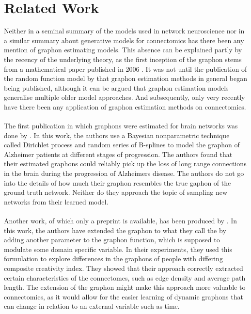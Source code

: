 \documentclass[11pt]{report} %
\begin{document}
\section{Related Work} 
Neither in a seminal summary of the models used in network neuroscience \cite{Bassett2018} nor in a similar summary about generative models for connectomics \cite{Betzel2016} has there been any mention of graphon estimating models. 
This absence can be explained partly by the recency of the underlying theory, as the first inception of the graphon stems from a mathematical paper published in 2006 \cite{lovasz2006}. 
It was not until the publication of the random function model by  that graphon estimation methods in general began being published, although it can be argued that graphon estimation models generalise multiple older model approaches.
And subsequently, only very recently have there been any application of graphon estimation methods on connectomics.\\\\
The first publication in which graphons were estimated for brain networks was done by . 
In this work, the authors use a Bayesian nonparametric technique called Dirichlet process and random series of B-splines to model the graphon of Alzheimer patients at different stages of progression. 
The authors found that their estimated graphons could reliably pick up the loss of long range connections in the brain during the progression of Alzheimers disease. 
The authors do not go into the details of how much their graphon resembles the true gaphon of the ground truth network. 
Neither do they approach the topic of sampling new networks from their learned model. \\\\
Another work, of which only a preprint is available, has been produced by . 
In this work, the authors have extended the graphon to what they call the  by adding another parameter to the graphon function, which is supposed to modulate some domain specific variable. 
In their experiments, they used this formulation to explore differences in the graphons of people with differing composite creativity index. 
They showed that their approach correctly extracted certain characteristics of the connectomes, such as edge density and average path length. 
The extension of the graphon might make this approach more valuable to connectomics, as it would allow for the easier learning of dynamic graphons that can change in relation to an external variable such as time. 
\end{document}
